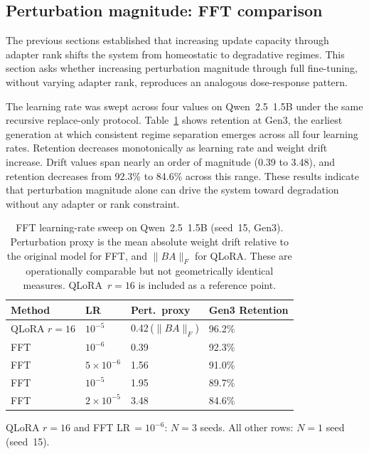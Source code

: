 \documentclass[a4paper,fleqn]{cas-dc}
\newif\ifshowchanges
\newcommand{\rev}[1]{\ifshowchanges{\color{blue}#1}\else{#1}\fi}
\begin{document}
\subsection{Perturbation magnitude: FFT comparison}\label{sec:res_fft}

The previous sections established that increasing update capacity through adapter
rank shifts the system from homeostatic to degradative regimes. This section asks
whether increasing perturbation magnitude through full fine-tuning, without
varying adapter rank, reproduces an analogous dose-response pattern.

The learning rate was swept across four values on Qwen~2.5~1.5B under the same
recursive replace-only protocol. Table~\ref{tab:fft_sweep} shows retention
at Gen3, the earliest generation at which consistent regime separation emerges across
all four learning rates. Retention decreases monotonically as learning rate and weight drift increase. Drift
values span nearly an order of magnitude (0.39 to 3.48), and retention decreases
from 92.3\% to 84.6\% across this range. These results indicate that
perturbation magnitude alone can drive the system toward degradation without any
adapter or rank constraint.

\begin{table}[width=.95\linewidth,cols=4,pos=htbp]
\caption{FFT learning-rate sweep on Qwen~2.5~1.5B (seed~15, Gen3). Perturbation
proxy is the mean absolute weight drift relative to the original model for FFT,
and $\|BA\|_F$ for QLoRA. These are operationally comparable but not
geometrically identical measures. QLoRA~$r=16$ is included as a reference
point.}\label{tab:fft_sweep}
\begin{tabular*}{\tblwidth}{@{} llll@{} }
\toprule
Method & LR & Pert.\ proxy & Gen3 Retention \\
\midrule
QLoRA $r=16$ & $10^{-5}$          & 0.42\,($\|BA\|_F$) & 96.2\% \\
FFT          & $10^{-6}$          & 0.39               & 92.3\% \\
FFT          & $5{\times}10^{-6}$ & 1.56               & 91.0\% \\
FFT          & $10^{-5}$          & 1.95               & 89.7\% \\
FFT          & $2{\times}10^{-5}$ & 3.48               & 84.6\% \\
\bottomrule
\end{tabular*}
\rev{{\footnotesize QLoRA $r=16$ and FFT LR\,$=10^{-6}$: $N=3$ seeds. All other rows: $N=1$ seed (seed~15).}}
\end{table}
\end{document}
